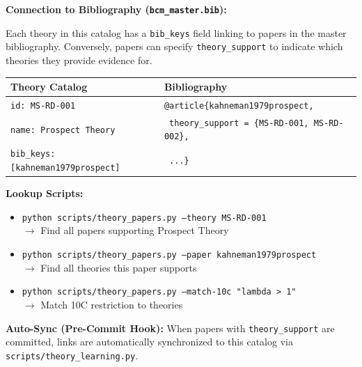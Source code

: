 \begin{tcolorbox}[colback=yellow!5!white, colframe=yellow!60!black,
    title=\textbf{Bidirectional Paper Integration}]

\textbf{Connection to Bibliography (\texttt{bcm\_master.bib}):}

Each theory in this catalog has a \texttt{bib\_keys} field linking to papers in the
master bibliography. Conversely, papers can specify \texttt{theory\_support} to
indicate which theories they provide evidence for.

\begin{center}
\begin{tabular}{|l|l|}
\hline
\textbf{Theory Catalog} & \textbf{Bibliography} \\
\hline
\texttt{id: MS-RD-001} & \texttt{@article\{kahneman1979prospect,} \\
\texttt{name: Prospect Theory} & \texttt{  theory\_support = \{MS-RD-001, MS-RD-002\},} \\
\texttt{bib\_keys: [kahneman1979prospect]} & \texttt{  ...\}} \\
\hline
\end{tabular}
\end{center}

\textbf{Lookup Scripts:}
\begin{itemize}[nosep]
    \item \texttt{python scripts/theory\_papers.py --theory MS-RD-001} \\
          $\rightarrow$ Find all papers supporting Prospect Theory
    \item \texttt{python scripts/theory\_papers.py --paper kahneman1979prospect} \\
          $\rightarrow$ Find all theories this paper supports
    \item \texttt{python scripts/theory\_papers.py --match-10c "lambda > 1"} \\
          $\rightarrow$ Match 10C restriction to theories
\end{itemize}

\textbf{Auto-Sync (Pre-Commit Hook):}
When papers with \texttt{theory\_support} are committed, links are automatically
synchronized to this catalog via \texttt{scripts/theory\_learning.py}.

\end{tcolorbox}

